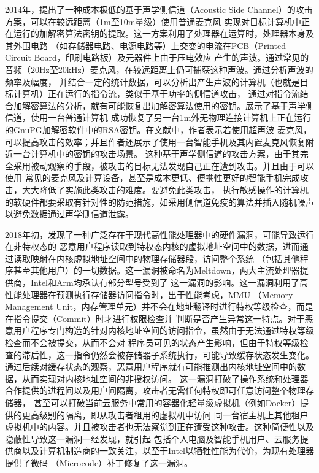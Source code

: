 2014年，\citet{acoustic}提出了一种成本极低的基于声学侧信道（Acoustic Side Channel）的攻击方案，可以在较远距离（1m至10m量级）使用普通麦克风
实现对目标计算机中正在运行的加解密算法密钥的提取。这一方案利用了处理器在运算时，处理器本身及其外围电路
（如存储器电路、电源电路等）上交变的电流在PCB（Printed Circuit Board，印刷电路板）及元器件上由于压电效应
产生的声波。通过常见的音频（20Hz至20kHz）麦克风，在较远距离上仍可捕获这种声波。通过分析声波的频率及幅度，
并结合一定的统计数据，可以分析出产生声波的计算机（也就是目标计算机）正在运行的指令流，类似于基于功率的侧信道攻击，
通过对指令流结合加解密算法的分析，就有可能恢复出加解密算法使用的密钥。\citet{acoustic}展示了基于声学侧信道，使用一台普通计算机
成功恢复了另一台1m外无物理连接计算机上正在运行的GnuPG加解密软件中的RSA密钥。在文献中，作者表示若使用超声波
麦克风，可以提高攻击的效率；并且作者还展示了使用一台智能手机及其内置麦克风恢复附近一台计算机中的密钥的攻击场景。
这种基于声学侧信道的攻击方案，由于其完全采用被动观察的手段，被攻击的目标无法发现自己正在遭到攻击。并且由于可以使用
常见的麦克风及计算设备，甚至是成本更低、便携性更好的智能手机完成攻击，大大降低了实施此类攻击的难度。要避免此类攻击，
执行敏感操作的计算机的软硬件都要采取有针对性的防范措施，如采用侧信道免疫的算法并插入随机噪声以避免数据通过声学侧信道泄露。

2018年初，\citet{lipp_meltdown_2018}发现了一种广泛存在于现代高性能处理器中的硬件漏洞，可能导致运行在非特权态的
恶意用户程序读取到特权态内核的虚拟地址空间中的数据，进而通过读取映射在内核虚拟地址空间中的物理存储器段，访问整个系统
（包括其他程序甚至其他用户）的一切数据。这一漏洞被命名为Meltdown，两大主流处理器提供商，Intel和Arm均承认有部分型号受到了
这一漏洞的影响。这一漏洞利用了高性能处理器在预测执行存储器访问指令时，出于性能考虑，MMU
（Memory Management Unit，内存管理单元）并不会在地址翻译时进行特权等级检查，而是在指令提交（Commit）时才进行权限检查并
判断是否产生异常这一特点。对于恶意用户程序专门构造的针对内核地址空间的访问指令，虽然由于无法通过特权等级检查而不会被提交，从而不会对
程序员可见的状态产生影响，但由于特权等级检查的滞后性，这一指令仍然会被存储器子系统执行，可能导致缓存状态发生变化。
通过后续对缓存状态的观察，恶意用户程序就有可能推测出内核地址空间中的数据，从而实现对内核地址空间的非授权访问。
这一漏洞打破了操作系统和处理器合作提供的进程间以及用户间隔离，攻击者无需任何特权即可任意访问整个物理存储器，
甚至可以打破当前云服务中常用的容器化轻量级虚拟机（例如Docker）提供的更高级别的隔离，即从攻击者租用的虚拟机中访问
同一台宿主机上其他租户虚拟机中的内容。并且被攻击者也无法察觉到正在遭受这种攻击。这种简便性以及隐蔽性导致这一漏洞一经发现，就引起
包括个人电脑及智能手机用户、云服务提供商以及计算机制造商的一致关注，以至于Intel以牺牲性能为代价，为现有处理器提供了微码
（Microcode）补丁修复了这一漏洞。


